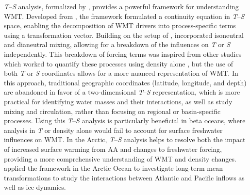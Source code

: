 \documentclass[draft]{agujournal2019}
\begin{document}
\emph{T}--\emph{S} analysis, formalized by , provides a powerful framework for understanding WMT. Developed from , the  framework formulated a continuity equation in \emph{T}--\emph{S} space, enabling the decomposition of WMT drivers into process-specific terms using a transformation vector. Building on the setup of ,  incorporated isoneutral and dianeutral mixing, allowing for a breakdown of the influences on \emph{T} or \emph{S} independently. This breakdown of forcing terms was inspired from other studies which worked to quantify these processes using density alone \cite{Tziperman1986,Nurser1999,Marshall1999,Iudicone2008}, but the use of both \emph{T} or \emph{S} coordinates allows for a more nuanced representation of WMT. In this approach, traditional geographic coordinates (latitude, longitude, and depth) are abandoned in favor of a two-dimensional \emph{T}--\emph{S} representation, which is more practical for identifying water masses and their interactions, as well as study mixing and circulation, rather than focusing on regional or basin-specific processes. Using this \emph{T}--\emph{S} analysis is particularly beneficial in beta oceans, where analysis in \emph{T} or density alone would fail to account for surface freshwater influences on WMT. In the Arctic, \emph{T}--\emph{S} analysis helps to resolve both the impact of increased surface warming from AA and changes to freshwater forcing, providing a more comprehensive understanding of WMT and density changes.  applied the  framework in the Arctic Ocean to investigate long-term mean transformations to study the interactions between Atlantic and Pacific inflows as well as ice dynamics.






\end{document}

